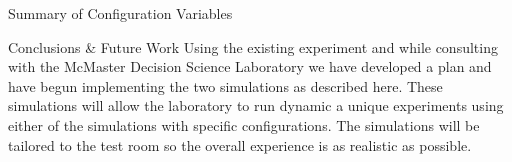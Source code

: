 \documentclass[22pt]{beamer}
\begin{document}
\begin{frame}[fragile]
\begin{textblock}{7.25}
\begin{block}{Summary of Configuration Variables}
\begin{comment}
\begin{center}
\begin{table}
\caption{Descriptions of selected demos\label{tab:summ}}
\begin{tabular}{ | m{1.2em} | m{7em} | m{25cm}| } 
\hline
\# & Name & Purpose  \\ 
\hline
1 & Ngon & Introduction to polygons with equal-length sides\\ 
\hline
2 & Scale & Introduction to scale function\\
\hline
3 & Outline & Styles of Outlines \\
\hline
4 & Transparency & Controlling the transparency of shapes\\
\hline
5 & Cookies & Introduction to move \\  
\hline
6 & Rotation & Rotating objects using degrees\\
\hline
7 & Pile Up & Explaining how order code affects layering of shapes\\ 
\hline
8 & Rainbow & Application of order\\ 
\hline
9 & Night & Application of draw order and transparency \\ 
\hline
10 & Candles & Application of scale and colours  \\ 
\hline
11 &  Colourful Flower & Application of rotation \\ 
 \hline
 12 & Apple & Introduction to animation in rotation \\ 
 \hline
13 &  Car & Creating simple scenes \\ 
 \hline
14 &  Door & Inverting shape using negative scale \\  
\hline
15 &  PacMan & Animating movement \\ 
\hline
16 &  Raindrop & Introduction to creating objects \\  
 \hline


\end{tabular}
\end{table}
\end{center}
\end{comment}
\end{block}

\begin{block}{Conclusions \& Future Work}
Using the existing experiment and while consulting with the McMaster Decision Science Laboratory we have developed a plan and have begun implementing the two simulations as described here. These simulations will allow the laboratory to run dynamic a unique experiments using either of the simulations with specific configurations. The simulations will be tailored to the test room so the overall experience is as realistic as possible.
\end{block}


\end{textblock}
\end{frame}
\end{document}
